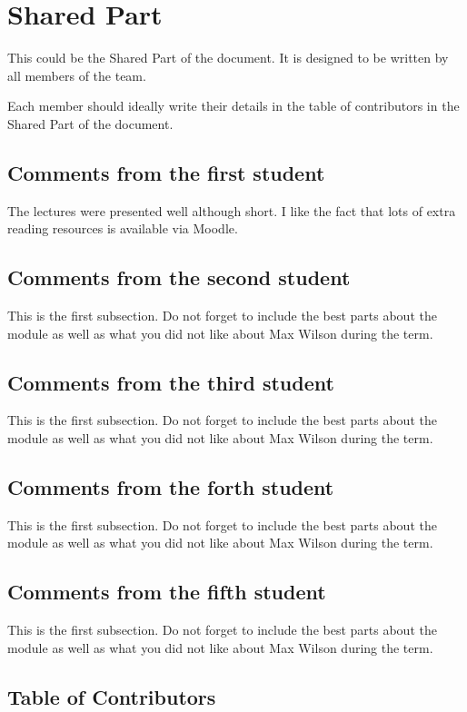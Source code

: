 \section{Shared Part}

This could be the Shared Part of the document. It is designed to be written by all members of the team.

Each member should ideally write their details in the table of contributors in the Shared Part of the document.

\subsection{Comments from the first student}
The lectures were presented well although short. I like the fact that lots of extra reading resources is available via Moodle.

\subsection{Comments from the second student}
This is the first subsection. Do not forget to include the best parts about the module as well as what you did not like about Max Wilson during the term.

\subsection{Comments from the third student}
This is the first subsection. Do not forget to include the best parts about the module as well as what you did not like about Max Wilson during the term.

\subsection{Comments from the forth student}
This is the first subsection. Do not forget to include the best parts about the module as well as what you did not like about Max Wilson during the term.

\subsection{Comments from the fifth student}
This is the first subsection. Do not forget to include the best parts about the module as well as what you did not like about Max Wilson during the term.

\subsection{Table of Contributors}


